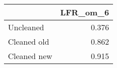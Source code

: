 \begin{tabular}{lr}
\toprule
{} & LFR_om_6 \\
\midrule
Uncleaned   &    0.376 \\
Cleaned old &    0.862 \\
Cleaned new &    0.915 \\
\bottomrule
\end{tabular}
